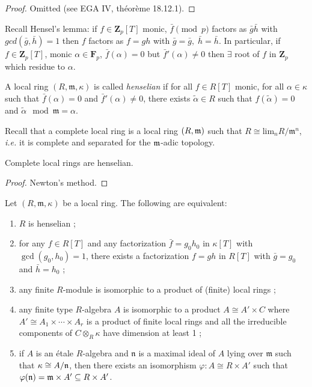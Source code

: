 \begin{proof}
Omitted (see EGA IV, th\'eor\`eme 18.12.1).
\end{proof}

\noindent
Recall Hensel's lemma: if $f\in \mathbf{Z}_p[T]$ monic, $\bar{f}\pmod{p}$
factors as  $\bar g\bar h$ with $gcd(\bar{g}, \bar{h})=1$ then $f$ factors
as $f = gh$ with  $\bar{g}=\bar{g}, \; \bar{h}=\bar{h}$. 
In particular, if $f \in \mathbf{Z}_p[T]$, monic
$\alpha\in \mathbf{F}_p$, $\bar f(\alpha) =0$  but $\bar f'(\alpha)\neq 0$
then $\exists $ root of $f$ in $\mathbf{Z}_p$ which  residue to $\alpha$. 


\begin{definition}
A local ring $(R, \mathfrak m, \kappa)$ is called \emph{henselian} if for all 
$f\in R[T]$ monic, for all $\alpha\in \kappa$ such that $\bar f(\alpha)=0$ and 
$\bar f'(\alpha)\neq 0$, there exists $\tilde\alpha\in R$ such that 
$f(\tilde\alpha) = 0$ and $\tilde\alpha\mod\mathfrak m = \alpha$. 
\end{definition} 

\noindent
Recall that a complete local ring is a local ring $(R, \frak m)$ such that  
$R\cong \text{lim}_n R/\mathfrak m^n$, {\it i.e.} it is complete and separated 
for the $\frak m$-adic topology.

\begin{theorem}
Complete local rings are henselian.
\end{theorem}

\begin{proof}
Newton's method.
\end{proof}

\begin{theorem} \label{thm:eqDefHenselian}
Let $(R, \mathfrak m, \kappa)$ be a local ring. The following are equivalent:
\begin{enumerate}
\item $R$ is henselian ;
\item for any $f\in R[T]$ and any factorization $\bar f = g_0 h_0$ in 
$\kappa[T]$ with $\gcd(g_0,h_0)=1$, there exists a factorization $f=gh$ in 
$R[T]$ with $\bar g = g_0$ and $\bar h=h_0$ ;
\item any finite $R$-module is isomorphic to a product of (finite) local rings ;
\item any finite type $R$-algebra $A$ is isomorphic to a product $A \cong A' 
\times C$ where $A' \cong A_1 \times \cdots \times A_r$ is a product of finite 
local rings and all the irreducible components of $C\otimes_R\kappa$ have 
dimension at least 1 ;
\item if $A$ is an \'etale $R$-algebra and $\mathfrak n$ is a maximal ideal of 
$A$ lying over $\mathfrak m$ such that $\kappa \cong A/\frak n$, then there 
exists an isomorphism $\varphi: A \cong R\times A'$ such that $\varphi(\frak n) 
= \frak m \times A'\subseteq R\times A'$.
\end{enumerate}
\end{theorem}

